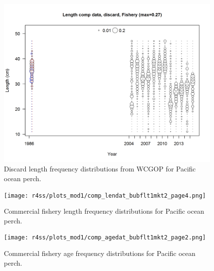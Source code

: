 \documentclass[12pt,]{article}
\begin{document}
\FloatBarrier

\begin{figure}
\centering
\includegraphics{r4ss/plots_mod1/comp_lendat_bubflt1mkt1.png}
\caption{Discard length frequency distributions from WCGOP for Pacific
ocean perch. \label{fig:WCGOP_discard}}
\end{figure}

\FloatBarrier

\begin{figure}
\centering
\texttt{[image: r4ss/plots\_mod1/comp\_lendat\_bubflt1mkt2\_page4.png]}
\caption{Commercial fishery length frequency distributions for Pacific
ocean perch. \label{fig:Comm_Length}}
\end{figure}

\FloatBarrier

\begin{figure}
\centering
\texttt{[image: r4ss/plots\_mod1/comp\_agedat\_bubflt1mkt2\_page2.png]}
\caption{Commercial fishery age frequency distributions for Pacific
ocean perch. \label{fig:Comm_Age}}
\end{figure}

\FloatBarrier
\end{document}
